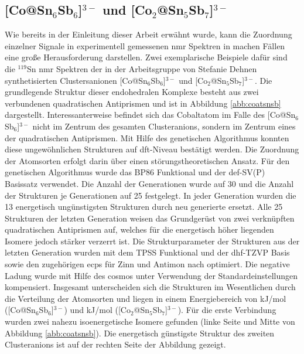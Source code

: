 \subsection{\texorpdfstring{[Co@Sn$_6$Sb$_6$]$^{3-}$ und [Co$_2$@Sn$_5$Sb$_7$]$^{3-}$}{[Co at Sn\_6Sb\_6]3- und [Co\_2 at Sn\_5Sb\_7]3-}}
Wie bereits in der Einleitung dieser Arbeit erwähnt wurde, kann die Zuordnung einzelner Signale in experimentell gemessenen \ac{nmr} Spektren in machen Fällen eine große Herausforderung darstellen. Zwei exemplarische Beispiele dafür sind die $^{119}$Sn \ac{nmr} Spektren der in der Arbeitsgruppe von Stefanie Dehnen synthetisierten Clustersanionen [Co@Sn$_6$Sb$_6$]$^{3-}$ und [Co$_2$@Sn$_5$Sb$_7$]$^{3-}$.\supercite{wilson2018structure} Die grundlegende Struktur dieser endohedralen Komplexe besteht aus zwei verbundenen quadratischen Antiprismen und ist in Abbildung \ref{abb:coatsnsb} dargestellt. Interessanterweise befindet sich das Cobaltatom im Falle des [Co@Sn$_6$Sb$_6$]$^{3-}$ nicht im Zentrum des gesamten Clusteranions, sondern im Zentrum eines der quadratischen Antiprismen. Mit Hilfe des genetischen Algorithmus\supercite{weigend2014extending} konnten diese ungewöhnlichen Strukturen auf \ac{dft}-Niveau bestätigt werden. Die Zuordnung der Atomsorten erfolgt darin über einen störungstheoretischen Ansatz. Für den genetischen Algorithmus wurde das BP86 Funktional\supercite{perdew1986density,becke1988density} und der def-SV(P) Basissatz\supercite{eichkorn1997auxiliary} verwendet. Die Anzahl der Generationen wurde auf 30 und die Anzahl der Strukturen je Generationen auf 25 festgelegt. In jeder Generation wurden die 13 energetisch ungünstigsten Strukturen durch neu generierte ersetzt. Alle 25 Strukturen der letzten Generation weisen das Grundgerüst von zwei verknüpften quadratischen Antiprismen auf, welches für die energetisch höher liegenden Isomere jedoch stärker verzerrt ist. Die Strukturparameter der Strukturen aus der letzten Generation wurden  mit dem TPSS Funktional\supercite{tao2003climbing} und der dhf-TZVP Basis\supercite{weigend2010segmented} sowie den zugehörigen \acp{ecp}\supercite{metz2000small} für Zinn und Antimon nach optimiert. Die negative Ladung wurde mit Hilfe des \acp{cosmo}\supercite{klamt1993cosmo} unter Verwendung der Standardeinstellungen kompensiert. Insgesamt unterscheiden sich die Strukturen im Wesentlichen durch die Verteilung der Atomsorten und liegen in einem Energiebereich von \unit[37]{kJ/mol} ([Co@Sn$_6$Sb$_6$]$^{3-}$) und \unit[22]{kJ/mol} ([Co$_2$@Sn$_5$Sb$_7$]$^{3-}$). Für die erste Verbindung wurden zwei nahezu isoenergetische Isomere gefunden (linke Seite und Mitte von Abbildung \ref{abb:coatsnsb}). Die energetisch günstigste Struktur des zweiten Clusteranions ist auf der rechten Seite der Abbildung gezeigt.

